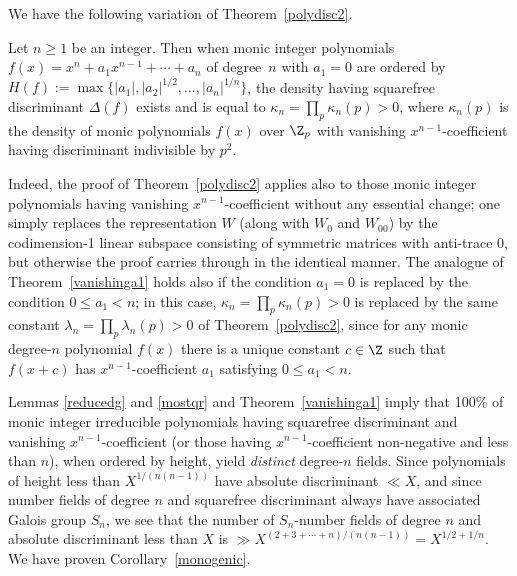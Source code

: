 We have the following variation of Theorem~\ref{polydisc2}.

\begin{theorem}
\notready\label{vanishinga1}
Let $n\geq1$ be an integer.  Then when
monic integer polynomials $f(x)=x^n+a_1x^{n-1}+\cdots+a_n$ of
degree~$n$ with $a_1=0$ are ordered by $H(f):=
\max\{|a_1|,|a_2|^{1/2},\ldots,|a_n|^{1/n}\}$, the density having
squarefree discriminant $\Delta(f)$ exists and is equal to
$\kappa_n=\prod_p\kappa_n(p)>0$, where $\kappa_n(p)$ is the density of
monic polynomials $f(x)$ over $\Z_p$ with vanishing
$x^{n-1}$-coefficient having discriminant indivisible by $p^2$.
\end{theorem}

Indeed, the proof of Theorem~\ref{polydisc2} applies also to those
monic integer polynomials having vanishing $x^{n-1}$-coefficient %
without any essential change; one simply replaces the representation
$W$ (along with $W_0$ and $W_{00}$) by the codimension-1 linear
subspace consisting of symmetric matrices with anti-trace $0$, but
otherwise the proof carries through in the identical manner.  The
analogue of Theorem~\ref{vanishinga1} holds also if the condition
$a_1=0$ is replaced by the condition $0\leq a_1<n$; in this case,
$\kappa_n=\prod_p\kappa_n(p)>0$ is replaced by the same constant
$\lambda_n=\prod_p\lambda_n(p)>0$ of Theorem~\ref{polydisc2}, since
for any monic degree-$n$ polynomial $f(x)$ there is a unique constant
$c\in\Z$ such that $f(x+c)$ has $x^{n-1}$-coefficient $a_1$ satisfying
$0\leq a_1<n$.


Lemmas \ref{reducedg} and \ref{mostqr} and Theorem~\ref{vanishinga1}
imply that 100\% of monic integer irreducible polynomials having
squarefree discriminant and vanishing $x^{n-1}$-coefficient (or those
having $x^{n-1}$-coefficient non-negative and less than $n$), when
ordered by height, yield {\it distinct} degree-$n$ fields.  Since
polynomials of height less than $X^{1/(n(n-1))}$ have absolute
discriminant $\ll X$, and since number fields of degree $n$ and
squarefree discriminant always have associated Galois group $S_n$, we
see that the number of $S_n$-number fields of degree $n$ and absolute
discriminant less than $X$ is $\gg
X^{(2+3+\cdots+n)/(n(n-1))}=X^{1/2+1/n}$. We have proven
Corollary~\ref{monogenic}.

\begin{remark}
\end{remark}

